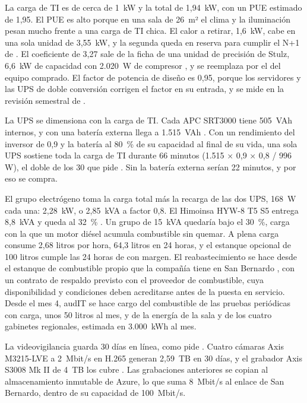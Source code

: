 La carga de TI es de cerca de 1~kW y la total de 1,94~kW, con un PUE estimado de 1,95. El PUE es alto
porque en una sala de 26~m² el clima y la iluminación pesan mucho frente a una carga de TI chica. El
calor a retirar, 1,6~kW, cabe en una sola unidad de 3,55~kW, y la segunda queda en reserva para cumplir
el N+1 de . El coeficiente de 3,27 sale de la ficha de una unidad de precisión de
Stulz, 6,6~kW de capacidad con 2.020~W de compresor \parencite{stulz_minispace}, y se reemplaza por el del
equipo comprado. El factor de potencia de diseño es 0,95, porque los servidores y las UPS de doble
conversión corrigen el factor en su entrada, y se mide en la revisión semestral de
.

La UPS se dimensiona con la carga de TI. Cada APC SRT3000 tiene 505~VAh internos, y con una batería
externa llega a 1.515~VAh \parencite{apc_srt3000}. Con un rendimiento del inversor de 0,9 y la batería al
80~\% de su capacidad al final de su vida, una sola UPS sostiene toda la carga de TI durante 66 minutos
(1.515 × 0,9 × 0,8 / 996 W), el doble de los 30 que pide . Sin la batería externa
serían 22 minutos, y por eso se compra.

El grupo electrógeno toma la carga total más la recarga de las dos UPS, 168~W cada una: 2,28~kW, o
2,85~kVA a factor 0,8. El Himoinsa HYW-8 T5 S5 entrega 8,8~kVA y queda al 32~\% \parencite{himoinsa_hyw8}.
Un grupo de 15~kVA quedaría bajo el 30~\%, carga con la que un motor diésel acumula combustible sin
quemar. A plena carga consume 2,68 litros por hora, 64,3 litros en 24 horas, y el estanque opcional de
100 litros cumple las 24 horas de  con margen. El reabastecimiento se hace desde el
estanque de combustible propio que la compañía tiene en San Bernardo , con un
contrato de respaldo previsto con el proveedor de combustible, cuya disponibilidad y condiciones deben acreditarse antes de la puesta en servicio. Desde el mes 4, audIT se hace cargo del
combustible de las pruebas periódicas con carga, unos 50 litros al mes, y de la energía de la sala y de
los cuatro gabinetes regionales, estimada en 3.000~kWh al mes.

La videovigilancia guarda 30 días en línea, como pide . Cuatro cámaras Axis
M3215-LVE a 2~Mbit/s en H.265 generan 2,59~TB en 30 días, y el grabador Axis S3008 Mk II de 4~TB los
cubre \parencite{axis_m3215,axis_s3008}. Las grabaciones anteriores se copian al almacenamiento inmutable
de Azure, lo que suma 8~Mbit/s al enlace de San Bernardo, dentro de su capacidad de 100~Mbit/s.

